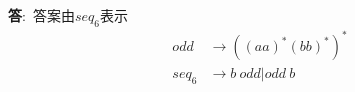 \documentclass[12pt,a4paper]{article}
\newenvironment{problems}{\begin{list}{}{\renewcommand{\makelabel}[1]{\textbf{##1}\hfil}}}{\end{list}}
\newenvironment{steps}{\begin{list}{}{\renewcommand{\makelabel}[1]{##1)\hfil}}}{\end{list}}
\providecommand{\ans}{\textbf{答}:~}
\begin{document}
\begin{problems}
\begin{steps}
        \ans 答案由$seq_6$表示
        \begin{align*}
            odd&\rightarrow ((aa)^*(bb)^*)^*\\
            seq_6&\rightarrow b~odd|odd~b
        \end{align*}
    \end{steps} 
\end{problems}
\end{document}
